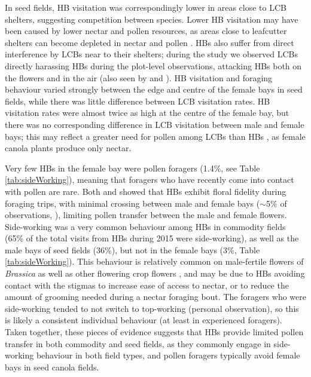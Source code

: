 \documentclass[12pt]{article} %
\begin{document}
In seed fields, HB visitation was correspondingly lower in areas close to LCB shelters, suggesting competition between species.
Lower HB visitation may have been caused by lower nectar and pollen resources, as areas close to leafcutter shelters can become depleted in nectar and pollen \citep{currie1997}.
HBs also suffer from direct interference by LCBs near to their shelters; during the study we observed LCBs directly harassing HBs during the plot-level observations, attacking HBs both on the flowers and in the air (also seen by \citealp{batra1978} and \citealp{waytes2022}). 
HB visitation and foraging behaviour varied strongly between the edge and centre of the female bays in seed fields, while there was little difference between LCB visitation rates.
HB visitation rates were almost twice as high at the centre of the female bay, but there was no corresponding difference in LCB visitation between male and female bays; this may reflect a greater need for pollen among LCBs than HBs \citep{cane2011}, as female canola plants produce only nectar.

Very few HBs in the female bay were pollen foragers (1.4\%, see Table \ref{tab:sideWorking}), meaning that foragers who have recently come into contact with pollen are rare.
Both \citet{waytes2022} and \citet{gaffney2019} showed that HBs exhibit floral fidelity during foraging trips, with minimal crossing between male and female bays ($\sim$5\% of observations, \citealp{waytes2022}), limiting pollen transfer between the male and female flowers.
Side-working was a very common behaviour among HBs in commodity fields (65\% of the total visits from HBs during 2015 were side-working), as well as the male bays of seed fields (36\%), but not in the female bays (3\%, Table \ref{tab:sideWorking}).
This behaviour is relatively common on male-fertile flowers of \textit{Brassica} \citep{free1973,free1983,delbrassine1988,mohr1988} as well as other flowering crop flowers \citep{thomson2001}, and may be due to HBs avoiding contact with the stigmas to increase ease of access to nectar, or to reduce the amount of grooming needed during a nectar foraging bout.
The foragers who were side-working tended to not switch to top-working (personal observation), so this is likely a consistent individual behaviour (at least in experienced foragers).
Taken together, these pieces of evidence suggests that HBs provide limited pollen transfer in both commodity and seed fields, as they commonly engage in side-working behaviour in both field types, and pollen foragers typically avoid female bays in seed canola fields.
\end{document}
